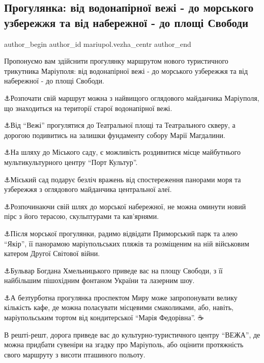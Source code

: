  
 
 
 
 

\subsection{Прогулянка: від водонапірної вежі - до морського узбережжя та від набережної - до площі Свободи}
\label{sec:19_02_2022.fb.mariupol.vezha_centr.1.progulyanka__v_d_vod}

\ifcmt
 author_begin
   author_id mariupol.vezha_centr
 author_end
\fi

Пропонуємо вам здійснити прогулянку маршрутом нового туристичного трикутника
Маріуполя: від водонапірної вежі - до морського узбережжя та від набережної -
до площі Свободи.

⚓️Розпочати свій маршрут можна з найвищого оглядового майданчика Маріуполя, що
знаходиться на території старої водонапірної вежі.

⚓️Від \enquote{Вежі} прогулятися до Театральної площі та Театрального скверу, а дорогою
подивитись на залишки фундаменту собору Марії Магдалини.

⚓️На шляху до Міського саду, є можливість роздивитися місце майбутнього
мультикультурного центру \enquote{Порт Культур}.

⚓️Міський сад подарує безліч вражень від спостереження панорами моря та
узбережжя з оглядового майданчика центральної алеї.

⚓️Розпочинаючи свій шлях до морської набережної, не можна оминути новий пірс з
його терасою, скульптурами та кав'ярнями.

⚓️Після морської прогулянки, радимо відвідати Приморський парк та алею \enquote{Якір},
її панорамою маріупольських пляжів та розміщеним на ній військовим катером
Другої Світової війни.

⚓️Бульвар Богдана Хмельницького приведе вас на площу Свободи, з її найбільшим
пішохідним фонтаном України та лазерним шоу.

⚓️А безтурботна прогулянка проспектом Миру може запропонувати велику кількість
кафе, де можна поласувати місцевими смаколиками, або, навіть, маріупольським
тортом від кондитерської \enquote{Марія Федорівна}. ☕️

В решті-решт, дорога приведе вас до культурно-туристичного центру \enquote{ВЕЖА}, де
можна придбати сувеніри на згадку про Маріуполь, або оцінити протяжність свого
маршруту з висоти пташиного польоту.

